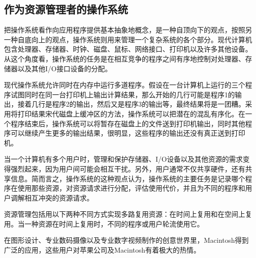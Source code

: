 \subsection{作为资源管理者的操作系统}
把操作系统看作向应用程序提供基本抽象地概念，是一种自顶向下的观点，按照另一种自底向上的观点，操作系统则用来管理一个复杂系统的各个部分。现代计算机包含处理器、存储器、时钟、磁盘、鼠标、网络接口、打印机以及许多其他设备。从这个角度看，操作系统的任务是在相互竞争的程序之间有序地控制对处理器、存储器以及其他I/O接口设备的分配。
\par 现代操作系统允许同时在内存中运行多道程序。假设在一台计算机上运行的三个程序试图同时在同一台打印机上输出计算结果，那么开始的几行可能是程序1的输出，接着几行是程序2的输出，然后又是程序3的输出等，最终结果将是一团糟。采用将打印结果宋代磁盘上缓冲区的方法，操作系统可以把潜在的混乱有序化。在一个程序结束后，操作系统可以将暂存在磁盘上的文件送到打印机输出，同时其他程序可以继续产生更多的输出结果，很明显，这些程序的输出还没有真正送到打印机。
\par 当一个计算机有多个用户时，管理和保护存储器、I/O设备以及其他资源的需求变得强烈起来，因为用户间可能会相互干扰。另外，用户通常不仅共享硬件，还有共享信息。简而言之，操作系统的这种观点认为，操作系统的主要任务是记录哪个程序在使用那些资源，对资源请求进行分配，评估使用代价，并且为不同的程序和用户调解相互冲突的资源请求。
\par 资源管理包括用以下两种不同方式实现多路复用资源：在时间上复用和在空间上复用。当一种资源在时间上复用时，不同的程序或用户轮流使用它。
\par 在图形设计、专业数码摄像以及专业数字视频制作的创意世界里，Macintosh得到广泛的应用，这些用户对苹果公司及Macintosh有着极大的热情。